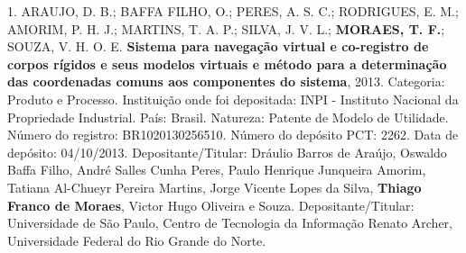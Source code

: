 
\begin{cvparagraph}

1. ARAUJO, D. B.; BAFFA FILHO, O.; PERES,
A. S. C.; RODRIGUES, E. M.; AMORIM, P. H. J.; MARTINS, T. A. P.; SILVA,
J. V. L.; \textbf{MORAES, T. F.}; SOUZA, V. H. O. E.
\textbf{Sistema para navegação virtual e co-registro de corpos rígidos e seus
modelos virtuais e método para a determinação das coordenadas comuns aos
componentes do sistema}, 2013. Categoria: Produto e Processo. Instituição
onde foi depositada: INPI - Instituto Nacional da Propriedade
Industrial. País: Brasil. Natureza: Patente de Modelo de Utilidade.
Número do registro: BR1020130256510. Número do depósito PCT: 2262. Data
de depósito: 04/10/2013. Depositante/Titular: Dráulio Barros de Araújo,
Oswaldo Baffa Filho, André Salles Cunha Peres, Paulo Henrique Junqueira
Amorim, Tatiana Al-Chueyr Pereira Martins, Jorge Vicente Lopes da Silva,
\textbf{Thiago Franco de Moraes}, Victor Hugo Oliveira e Souza.
Depositante/Titular: Universidade de São Paulo, Centro de Tecnologia da
Informação Renato Archer, Universidade Federal do Rio Grande do Norte.
\end{cvparagraph}


